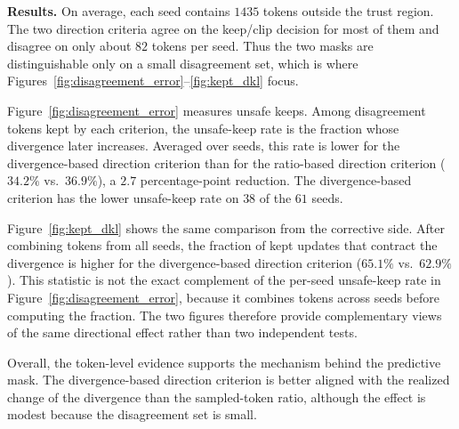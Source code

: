 \noindent\textbf{Results.}
On average, each seed contains $1435$ tokens outside the trust region.
The two direction criteria agree on the keep/clip decision for most of them and
disagree on only about $82$ tokens per seed.
Thus the two masks are distinguishable only on a small disagreement set, which is
where Figures~\ref{fig:disagreement_error}--\ref{fig:kept_dkl} focus.

Figure~\ref{fig:disagreement_error} measures unsafe keeps.
Among disagreement tokens kept by each criterion, the unsafe-keep rate is the
fraction whose divergence later increases.
Averaged over seeds, this rate is lower for the divergence-based direction
criterion than for the ratio-based direction criterion ($34.2\%$ vs.\ $36.9\%$),
a $2.7$ percentage-point reduction.
The divergence-based criterion has the lower unsafe-keep rate on $38$ of the
$61$ seeds.

Figure~\ref{fig:kept_dkl} shows the same comparison from the corrective side.
After combining tokens from all seeds, the fraction of kept updates that contract
the divergence is higher for the divergence-based direction criterion
($65.1\%$ vs.\ $62.9\%$).
This statistic is not the exact complement of the per-seed unsafe-keep rate in
Figure~\ref{fig:disagreement_error}, because it combines tokens across seeds before
computing the fraction.
The two figures therefore provide complementary views of the same directional
effect rather than two independent tests.

Overall, the token-level evidence supports the mechanism behind the predictive
mask.
The divergence-based direction criterion is better aligned with the realized
change of the divergence than the sampled-token ratio, although the effect is
modest because the disagreement set is small.
